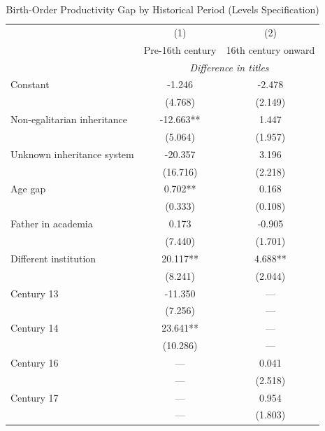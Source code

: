 
\begin{table}[H]
\centering
\caption{Birth-Order Productivity Gap by Historical Period (Levels Specification)}
\label{tab:period_levels_appendix}

\begin{tablebody}
\begin{tabular}{l c c}
\toprule
& (1) & (2) \\
& Pre-16th century & 16th century onward \\
& \multicolumn{2}{c}{\textit{Difference in titles}} \\
\midrule

Constant
& -1.246
& -2.478 \\
& (4.768)
& (2.149) \\

Non-egalitarian inheritance
& -12.663**
& 1.447 \\
& (5.064)
& (1.957) \\

Unknown inheritance system
& -20.357
& 3.196 \\
& (16.716)
& (2.218) \\

Age gap
& 0.702**
& 0.168 \\
& (0.333)
& (0.108) \\

Father in academia
& 0.173
& -0.905 \\
& (7.440)
& (1.701) \\

Different institution
& 20.117**
& 4.688** \\
& (8.241)
& (2.044) \\

Century 13
& -11.350
& --- \\
& (7.256)
& --- \\

Century 14
& 23.641**
& --- \\
& (10.286)
& --- \\

Century 16
& ---
& 0.041 \\
& ---
& (2.518) \\

Century 17
& ---
& 0.954 \\
& ---
& (1.803) \\


\end{tabular}
\end{tablebody}
\end{table}
